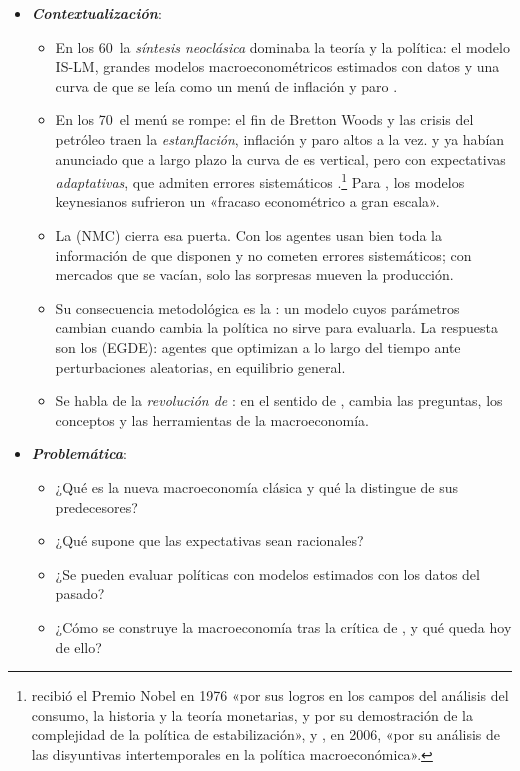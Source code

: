 \documentclass[11pt]{article}
\begin{document}
\begin{itemize}
\item \textbf{\emph{Contextualización}}:
  \begin{itemize}
  \item En los 60~la \emph{síntesis neoclásica} dominaba la teoría y la política: el modelo IS-LM, grandes modelos macroeconométricos estimados con datos y una curva de  que se leía como un menú de inflación y paro .
  \item En los 70~el menú se rompe: el fin de Bretton Woods y las crisis del petróleo traen la \emph{estanflación}, inflación y paro altos a la vez.  y  ya habían anunciado que a largo plazo la curva de  es vertical, pero con expectativas \emph{adaptativas}, que admiten errores sistemáticos  .\footnote{ recibió el Premio Nobel en 1976 «por sus logros en los campos del análisis del consumo, la historia y la teoría monetarias, y por su demostración de la complejidad de la política de estabilización»\nocite{Nobel1976Friedman}, y , en 2006, «por su análisis de las disyuntivas intertemporales en la política macroeconómica»\nocite{Nobel2006Phelps}.} Para \textcite{LucasSargent1979After}, los modelos keynesianos sufrieron un «fracaso econométrico a gran escala».
  \item La  (NMC) cierra esa puerta. Con \nocite{Muth1961Rational} los agentes usan bien toda la información de que disponen y no cometen errores sistemáticos; con mercados que se vacían, solo las sorpresas mueven la producción\nocite{Lucas1972Expectations}.
  \item Su consecuencia metodológica es la \nocite{Lucas1976Econometric}: un modelo cuyos parámetros cambian cuando cambia la política no sirve para evaluarla. La respuesta son los  (EGDE): agentes que optimizan a lo largo del tiempo ante perturbaciones aleatorias, en equilibrio general\nocite{KydlandPrescott1982Time}.
  \item Se habla de la \emph{revolución de }\nocite{DeVroey2016History}: en el sentido de , cambia las preguntas, los conceptos y las herramientas de la macroeconomía\nocite{Kuhn1962Structure}.
  \end{itemize}

\item \textbf{\emph{Problemática}}:
  \begin{itemize}
  \item ¿Qué es la nueva macroeconomía clásica y qué la distingue de sus predecesores?
  \item ¿Qué supone que las expectativas sean racionales?
  \item ¿Se pueden evaluar políticas con modelos estimados con los datos del pasado?
  \item ¿Cómo se construye la macroeconomía tras la crítica de , y qué queda hoy de ello?
  \end{itemize}


\end{itemize}
\end{document}
